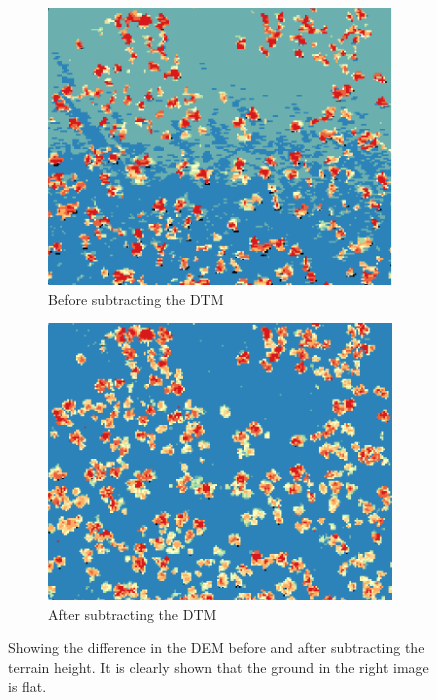 \documentclass{subfiles}
\begin{document}
\begin{figure} [h!]			
	\begin{subfigure}[t]{.49\textwidth}
		
		\centering
		\includegraphics[width=\textwidth]{img/dead/height}
		\caption{Before subtracting the DTM}
		\label{fig:height}
	\end{subfigure} \hfill
	\begin{subfigure}[t]{.49\textwidth}
		\centering
		\includegraphics[width=\textwidth]{img/dead/height_dtm}
		\caption{After subtracting the DTM} 
		\label{fig:height_dtm}
	\end{subfigure} \hfill
	\caption{Showing the difference in the DEM before and after subtracting the terrain height. It is clearly shown that the ground in the right image is flat.}  
	\label{fig:height_minus_dtm} 
\end{figure}
\end{document}
